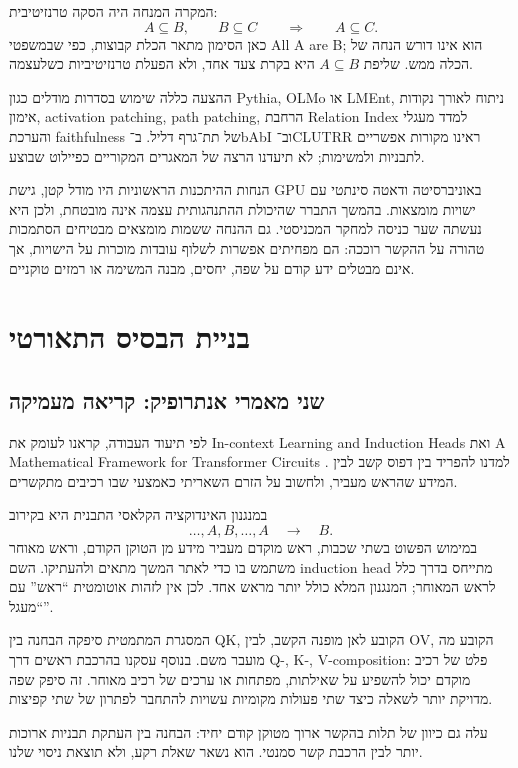 \documentclass[11pt,a4paper]{article}
\newcommand{\en}[1]{\textenglish{#1}}
\begin{document}
המקרה המנחה היה הסקה טרנזיטיבית:
\[
 A\subseteq B,\qquad B\subseteq C\qquad\Longrightarrow\qquad A\subseteq C.
\]
כאן הסימון מתאר הכלת קבוצות, כפי שבמשפטי \en{All A are B}; הוא אינו דורש הנחה של הכלה ממש. שליפת $A\subseteq B$ היא בקרת צעד אחד, ולא הפעלת טרנזיטיביות כשלעצמה.

ההצעה כללה שימוש בסדרות מודלים כגון \en{Pythia}, \en{OLMo} או \en{LMEnt}, ניתוח לאורך נקודות אימון, \en{activation patching}, \en{path patching}, הרחבת \en{Relation Index} למדד מעגלי והערכת \en{faithfulness} של תת־גרף דליל. ב־\en{bAbI} וב־\en{CLUTRR} ראינו מקורות אפשריים לתבניות ולמשימות; לא תיעדנו הרצה של המאגרים המקוריים כפיילוט שבוצע.

הנחות ההיתכנות הראשוניות היו מודל קטן, גישת \en{GPU} באוניברסיטה ודאטה סינתטי עם ישויות מומצאות. בהמשך התברר שהיכולת ההתנהגותית עצמה אינה מובטחת, ולכן היא נעשתה שער כניסה למחקר המכניסטי. גם ההנחה ששמות מומצאים מבטיחים הסתמכות טהורה על ההקשר רוככה: הם מפחיתים אפשרות לשלוף עובדות מוכרות על הישויות, אך אינם מבטלים ידע קודם על שפה, יחסים, מבנה המשימה או רמזים טוקניים.

\section{בניית הבסיס התאורטי}
\subsection{שני מאמרי אנתרופיק: קריאה מעמיקה}
לפי תיעוד העבודה, קראנו לעומק את \en{In-context Learning and Induction Heads} ואת \en{A Mathematical Framework for Transformer Circuits} \cite{olsson,framework}. למדנו להפריד בין דפוס קשב לבין המידע שהראש מעביר, ולחשוב על הזרם השאריתי כאמצעי שבו רכיבים מתקשרים.

במנגנון האינדוקציה הקלאסי התבנית היא בקירוב
\[
\ldots,A,B,\ldots,A \quad\longrightarrow\quad B.
\]
במימוש הפשוט בשתי שכבות, ראש מוקדם מעביר מידע מן הטוקן הקודם, וראש מאוחר משתמש בו כדי לאתר המשך מתאים ולהעתיקו. השם \en{induction head} מתייחס בדרך כלל לראש המאוחר; המנגנון המלא כולל יותר מראש אחד. לכן אין לזהות אוטומטית ``ראש'' עם ``מעגל''.

המסגרת המתמטית סיפקה הבחנה בין \en{QK}, הקובע לאן מופנה הקשב, לבין \en{OV}, הקובע מה מועבר משם. בנוסף עסקנו בהרכבת ראשים דרך \en{Q-, K-, V-composition}: פלט של רכיב מוקדם יכול להשפיע על שאילתות, מפתחות או ערכים של רכיב מאוחר. זה סיפק שפה מדויקת יותר לשאלה כיצד שתי פעולות מקומיות עשויות להתחבר לפתרון של שתי קפיצות.

עלה גם כיוון של תלות בהקשר ארוך מטוקן קודם יחיד: הבחנה בין העתקת תבניות ארוכות יותר לבין הרכבת קשר סמנטי. הוא נשאר שאלת רקע, ולא תוצאת ניסוי שלנו.
\end{document}
